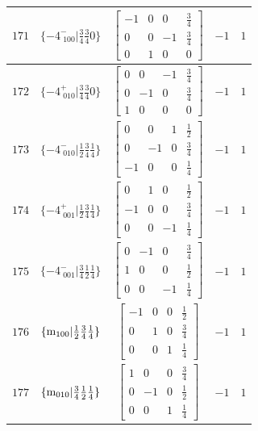 \documentclass[fleqn,8pt]{jsarticle}
\begin{document}
\begin{longtable}{ccccc}
$ 171 $ & $ \{-4^{-}_{\,\,100}|\frac{3}{4} \frac{3}{4} 0\} $ & $ \begin{bmatrix} -1 & 0 & 0 & \frac{3}{4} \\ 0 & 0 & -1 & \frac{3}{4} \\ 0 & 1 & 0 & 0 \end{bmatrix} $ & $ -1 $ & $ 1 $ \\ \hline
$ 172 $ & $ \{-4^{+}_{\,\,010}|\frac{3}{4} \frac{3}{4} 0\} $ & $ \begin{bmatrix} 0 & 0 & -1 & \frac{3}{4} \\ 0 & -1 & 0 & \frac{3}{4} \\ 1 & 0 & 0 & 0 \end{bmatrix} $ & $ -1 $ & $ 1 $ \\ \hline
$ 173 $ & $ \{-4^{-}_{\,\,010}|\frac{1}{2} \frac{3}{4} \frac{1}{4}\} $ & $ \begin{bmatrix} 0 & 0 & 1 & \frac{1}{2} \\ 0 & -1 & 0 & \frac{3}{4} \\ -1 & 0 & 0 & \frac{1}{4} \end{bmatrix} $ & $ -1 $ & $ 1 $ \\ \hline
$ 174 $ & $ \{-4^{+}_{\,\,001}|\frac{1}{2} \frac{3}{4} \frac{1}{4}\} $ & $ \begin{bmatrix} 0 & 1 & 0 & \frac{1}{2} \\ -1 & 0 & 0 & \frac{3}{4} \\ 0 & 0 & -1 & \frac{1}{4} \end{bmatrix} $ & $ -1 $ & $ 1 $ \\ \hline
$ 175 $ & $ \{-4^{-}_{\,\,001}|\frac{3}{4} \frac{1}{2} \frac{1}{4}\} $ & $ \begin{bmatrix} 0 & -1 & 0 & \frac{3}{4} \\ 1 & 0 & 0 & \frac{1}{2} \\ 0 & 0 & -1 & \frac{1}{4} \end{bmatrix} $ & $ -1 $ & $ 1 $ \\ \hline
$ 176 $ & $ \{{\rm m}_{100}|\frac{1}{2} \frac{3}{4} \frac{1}{4}\} $ & $ \begin{bmatrix} -1 & 0 & 0 & \frac{1}{2} \\ 0 & 1 & 0 & \frac{3}{4} \\ 0 & 0 & 1 & \frac{1}{4} \end{bmatrix} $ & $ -1 $ & $ 1 $ \\ \hline
$ 177 $ & $ \{{\rm m}_{010}|\frac{3}{4} \frac{1}{2} \frac{1}{4}\} $ & $ \begin{bmatrix} 1 & 0 & 0 & \frac{3}{4} \\ 0 & -1 & 0 & \frac{1}{2} \\ 0 & 0 & 1 & \frac{1}{4} \end{bmatrix} $ & $ -1 $ & $ 1 $ \\ \hline

\end{longtable}
\end{document}
